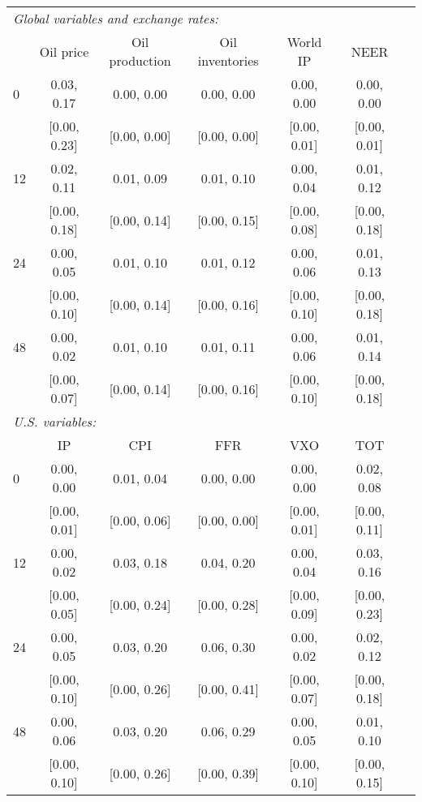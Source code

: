 \begin{tabular}{lcccccc}\toprule\midrule  
\multicolumn{6}{l}{\textit{Global variables and exchange rates:}} \\ 
 & Oil price & Oil production & Oil inventories & World IP & NEER  \\ \midrule  
 0 & 0.03,    0.17 & 0.00,    0.00 & 0.00,    0.00 & 0.00,    0.00 & 0.00,    0.00 \\  
 & [0.00,    0.23] & [0.00,    0.00] & [0.00,    0.00] & [0.00,    0.01] & [0.00,    0.01] \\  
 12 & 0.02,    0.11 & 0.01,    0.09 & 0.01,    0.10 & 0.00,    0.04 & 0.01,    0.12 \\  
 & [0.00,    0.18] & [0.00,    0.14] & [0.00,    0.15] & [0.00,    0.08] & [0.00,    0.18] \\  
 24 & 0.00,    0.05 & 0.01,    0.10 & 0.01,    0.12 & 0.00,    0.06 & 0.01,    0.13 \\  
 & [0.00,    0.10] & [0.00,    0.14] & [0.00,    0.16] & [0.00,    0.10] & [0.00,    0.18] \\  
 48 & 0.00,    0.02 & 0.01,    0.10 & 0.01,    0.11 & 0.00,    0.06 & 0.01,    0.14 \\  
 & [0.00,    0.07] & [0.00,    0.14] & [0.00,    0.16] & [0.00,    0.10] & [0.00,    0.18] \\[2ex] \midrule  
\multicolumn{6}{l}{\textit{U.S. variables:}} \\ 
 & IP & CPI & FFR & VXO & TOT  \\ \midrule  
 0 & 0.00,    0.00 & 0.01,    0.04 & 0.00,    0.00 & 0.00,    0.00 & 0.02,    0.08 \\  
 & [0.00,    0.01] & [0.00,    0.06] & [0.00,    0.00] & [0.00,    0.01] & [0.00,    0.11] \\  
 12 & 0.00,    0.02 & 0.03,    0.18 & 0.04,    0.20 & 0.00,    0.04 & 0.03,    0.16 \\  
 & [0.00,    0.05] & [0.00,    0.24] & [0.00,    0.28] & [0.00,    0.09] & [0.00,    0.23] \\  
 24 & 0.00,    0.05 & 0.03,    0.20 & 0.06,    0.30 & 0.00,    0.02 & 0.02,    0.12 \\  
 & [0.00,    0.10] & [0.00,    0.26] & [0.00,    0.41] & [0.00,    0.07] & [0.00,    0.18] \\  
 48 & 0.00,    0.06 & 0.03,    0.20 & 0.06,    0.29 & 0.00,    0.05 & 0.01,    0.10 \\  
 & [0.00,    0.10] & [0.00,    0.26] & [0.00,    0.39] & [0.00,    0.10] & [0.00,    0.15] \\  
\midrule\bottomrule 
\end{tabular}
